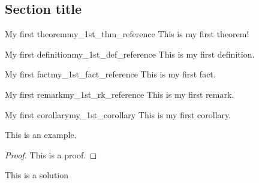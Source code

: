 \documentclass[11pt]{article}
\begin{document}
\newpage
\tableofcontents
\newpage
{}
\begin{flushleft}
\section*{Section title}
    \begin{thm}{My first theorem}{my_1st_thm_reference}
        This is my first theorem!
    \end{thm}
    
    \begin{defn}{My first definition}{my_1st_def_reference}
        This is my first definition.
    \end{defn}
    
    \begin{fact}{My first fact}{my_1st_fact_reference}
        This is my first fact.
    \end{fact}
    
    \begin{rk}{My first remark}{my_1st_rk_reference}
        This is my first remark.
    \end{rk}
    
    \begin{cor}{My first corollary}{my_1st_corollary}
        This is my first corollary.
    \end{cor}
    \begin{example}
        This is an example.
    \end{example}
    
    \begin{proof}
        This is a proof.
    \end{proof}
    
    \begin{soln}
        This is a solution
    \end{soln}
\newpage
\fancyhead{}
\end{flushleft}
\end{document}
